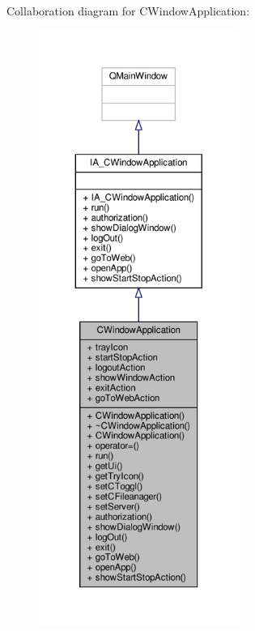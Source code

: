 Collaboration diagram for C\+Window\+Application\+:
\nopagebreak
\begin{figure}[H]
\begin{center}
\leavevmode
\includegraphics[height=550pt]{classCWindowApplication__coll__graph}
\end{center}
\end{figure}
